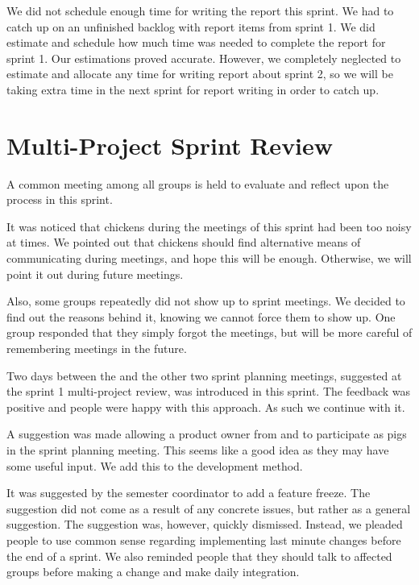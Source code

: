 We did not schedule enough time for writing the report this sprint. We had to catch up on an unfinished backlog with report items from sprint 1. We did estimate and schedule how much time was needed to complete the report for sprint 1. Our estimations proved accurate. However, we completely neglected to estimate and allocate any time for writing report about sprint 2, so we will be taking extra time in the next sprint for report writing in order to catch up.

\section{Multi-Project Sprint Review}\label{sec:s2_multiprj_review}
A common meeting among all groups is held to evaluate and reflect upon the process in this sprint.

It was noticed that chickens during the meetings of this sprint had been too noisy at times. We pointed out that chickens should find alternative means of communicating during meetings, and hope this will be enough. Otherwise, we will point it out during future meetings.

Also, some groups repeatedly did not show up to sprint meetings. We decided to find out the reasons behind it, knowing we cannot force them to show up. One group responded that they simply forgot the meetings, but will be more careful of remembering meetings in the future.

Two days between the \gui and the other two sprint planning meetings, suggested at the sprint 1 multi-project review, was introduced in this sprint. The feedback was positive and people were happy with this approach. As such we continue with it.

A suggestion was made allowing a product owner from \db and \bd to participate as pigs in the \gui sprint planning meeting. This seems like a good idea as they may have some useful input. We add this to the development method.

It was suggested by the semester coordinator to add a feature freeze. The suggestion did not come as a result of any concrete issues, but rather as a general suggestion. The suggestion was, however, quickly dismissed. Instead, we pleaded people to use common sense regarding implementing last minute changes before the end of a sprint. We also reminded people that they should talk to affected groups before making a change and make daily integration.